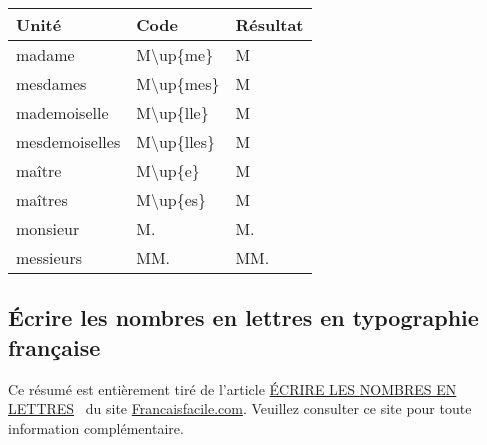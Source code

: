 \documentclass[a4paper,10pt]{article}
\begin{document}
\begin{center}%
\begin{tabular}{|l|l|l|}%
\hline%
\rowcolor{grisclair} \textbf{Unité} & \textbf{Code} & \textbf{Résultat} \\%
\hline%
madame & M\textbackslash up\{me\} & M\up{me}\\%
\hline%
mesdames & M\textbackslash up\{mes\} & M\up{mes}\\%
\hline%
mademoiselle & M\textbackslash up\{lle\} & M\up{lle}\\%
\hline%
mesdemoiselles & M\textbackslash up\{lles\} & M\up{lles}\\%
\hline%
maître & M\textbackslash up\{e\} & M\up{e}\\%
\hline%
maîtres & M\textbackslash up\{es\} & M\up{es}\\%
\hline%
monsieur & M. & M.\\%
\hline%
messieurs & MM. & MM.\\%
\hline%
\end{tabular}%
\end{center}%


\subsection{\'{E}crire les nombres en lettres en typographie française}%
\label{sub:ecrire_nombres_en_lettres}
Ce résumé est entièrement tiré de l'article \og \href{https://www.francaisfacile.com/exercices/exercice-francais-2/exercice-francais-53446.php}{ÉCRIRE LES NOMBRES EN LETTRES} \fg\ du site \href{https://www.francaisfacile.com/}{Francaisfacile.com}. Veuillez consulter ce site pour toute information complémentaire.
\end{document}
